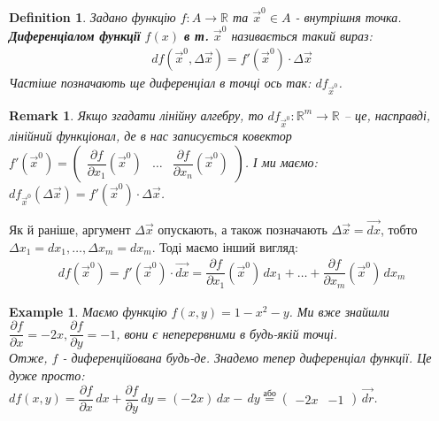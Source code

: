 \documentclass[a4paper, 10pt]{article}
\def\departial#1#2{\dfrac{\partial {#1}}{\partial {#2}}}
\theoremstyle{theoremdd}
\theoremstyle{theoremdd}
\theoremstyle{theoremdd}
\newtheorem{definition}[theorem]{Definition}
\theoremstyle{theoremdd}
\theoremstyle{theoremdd}
\newtheorem{example}[theorem]{Example}
\theoremstyle{theoremdd}
\theoremstyle{theoremdd}
\newtheorem{remark}[theorem]{Remark}
\theoremstyle{theoremdd}
\theoremstyle{theoremdd}
\begin{document}
\begin{definition}
Задано функцію $f: A \to \mathbb{R}$ та $\vec{x}^0 \in A$ - внутрішня точка.\\
\textbf{Диференціалом функції} $f(x)$ \textbf{в т.} $\vec{x}^0$ називається такий вираз:
\begin{align*}
df(\vec{x}^0, \Delta \vec{x}) = f'(\vec{x}^0) \cdot \Delta \vec{x}
\end{align*}
Частіше позначають ще диференціал в точці ось так: $df_{\vec{x}^0}$.
\end{definition}

\begin{remark}
Якщо згадати лінійну алгебру, то $df_{\vec{x}^0} \colon \mathbb{R}^m \to \mathbb{R}$ -- це, насправді, лінійний функціонал, де в нас записується ковектор $f'(\vec{x}^0) = \begin{pmatrix}
\departial{f}{x_1}(\vec{x}^0) & \dots & \departial{f}{x_n}(\vec{x}^0)
\end{pmatrix}$. І ми маємо:\\
$df_{\vec{x}^0} (\Delta \vec{x}) = f'(\vec{x}^0) \cdot \Delta \vec{x}$.
\end{remark}

Як й раніше, аргумент $\Delta \vec{x}$ опускають, а також позначають $\Delta \vec{x}= \vec{dx}$, тобто \\ $\Delta x_1 = dx_1, \dots, \Delta x_m = dx_m$. Тоді маємо інший вигляд:
\begin{align*}
df(\vec{x}^0) = f'(\vec{x}^0) \cdot \vec{dx} = \departial{f}{x_1}(\vec{x}^0)\,dx_1 + \dots + \departial{f}{x_m}(\vec{x}^0)\,dx_m
\end{align*}

\begin{example}
Маємо функцію $f(x,y) = 1-x^2 - y$. Ми вже знайшли $\departial{f}{x} = -2x, \departial{f}{y} = -1$, вони є неперервними в будь-якій точці.\\
Отже, $f$ - диференційована будь-де. Знадемо тепер диференціал функції. Це дуже просто:\\
$d f(x,y) = \departial{f}{x}\,dx + \departial{f}{y}\,dy = (-2x)\,dx -\,dy \overset{\text{або}}{=} \begin{pmatrix}
-2x & -1
\end{pmatrix} \, \vec{dr}$.
\end{example}
\end{document}
